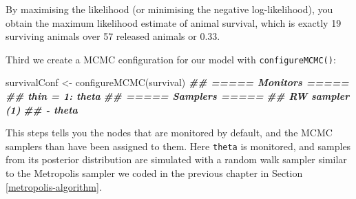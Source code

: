 \documentclass[
  12pt,
]{krantz}
\newenvironment{Shaded}{\begin{snugshade}}{\end{snugshade}}
\newcommand{\AttributeTok}[1]{\textcolor[rgb]{0.77,0.63,0.00}{#1}}
\newcommand{\CommentTok}[1]{\textcolor[rgb]{0.56,0.35,0.01}{\textit{#1}}}
\newcommand{\ControlFlowTok}[1]{\textcolor[rgb]{0.13,0.29,0.53}{\textbf{#1}}}
\newcommand{\DecValTok}[1]{\textcolor[rgb]{0.00,0.00,0.81}{#1}}
\newcommand{\DocumentationTok}[1]{\textcolor[rgb]{0.56,0.35,0.01}{\textbf{\textit{#1}}}}
\newcommand{\FloatTok}[1]{\textcolor[rgb]{0.00,0.00,0.81}{#1}}
\newcommand{\FunctionTok}[1]{\textcolor[rgb]{0.00,0.00,0.00}{#1}}
\newcommand{\NormalTok}[1]{#1}
\newcommand{\OtherTok}[1]{\textcolor[rgb]{0.56,0.35,0.01}{#1}}
\newcommand{\SpecialCharTok}[1]{\textcolor[rgb]{0.00,0.00,0.00}{#1}}
\newcommand{\StringTok}[1]{\textcolor[rgb]{0.31,0.60,0.02}{#1}}
\begin{document}
\begin{Shaded}
\end{Shaded}

By maximising the likelihood (or minimising the negative log-likelihood), you obtain the maximum likelihood estimate of animal survival, which is exactly 19 surviving animals over 57 released animals or 0.33.

Third we create a MCMC configuration for our model with \texttt{configureMCMC()}:

\begin{Shaded}
\begin{Highlighting}[]
\NormalTok{survivalConf }\OtherTok{\textless{}{-}} \FunctionTok{configureMCMC}\NormalTok{(survival)}
\DocumentationTok{\#\# ===== Monitors =====}
\DocumentationTok{\#\# thin = 1: theta}
\DocumentationTok{\#\# ===== Samplers =====}
\DocumentationTok{\#\# RW sampler (1)}
\DocumentationTok{\#\#   {-} theta}
\end{Highlighting}
\end{Shaded}

This steps tells you the nodes that are monitored by default, and the MCMC samplers than have been assigned to them. Here \texttt{theta} is monitored, and samples from its posterior distribution are simulated with a random walk sampler similar to the Metropolis sampler we coded in the previous chapter in Section \ref{metropolis-algorithm}.
\end{document}
